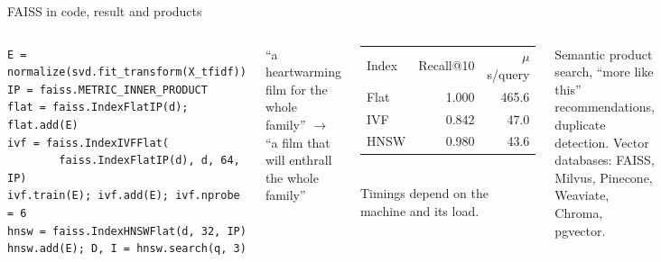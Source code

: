 \documentclass[aspectratio=169,11pt]{beamer}
\begin{document}
\begin{frame}[fragile]{FAISS in code, result and products}
\begin{columns}[T]
\begin{bcode}
\begin{lstlisting}
E = normalize(svd.fit_transform(X_tfidf))
IP = faiss.METRIC_INNER_PRODUCT
flat = faiss.IndexFlatIP(d); flat.add(E)
ivf = faiss.IndexIVFFlat(
        faiss.IndexFlatIP(d), d, 64, IP)
ivf.train(E); ivf.add(E); ivf.nprobe = 6
hnsw = faiss.IndexHNSWFlat(d, 32, IP)
hnsw.add(E); D, I = hnsw.search(q, 3)
\end{lstlisting}
\end{bcode}
\begin{bex}
``a heartwarming film for the whole family'' $\rightarrow$ ``a film that will enthrall the whole family''
\end{bex}
\begin{bres}
\begin{tabular}{lrr}
Index & Recall@10 & $\mu$s/query\\
Flat & 1.000 & 465.6\\
IVF & 0.842 & 47.0\\
HNSW & 0.980 & 43.6\\
\end{tabular}\\[1pt]
\footnotesize Timings depend on the machine and its load.
\end{bres}
\begin{bapp}
Semantic product search, ``more like this'' recommendations, duplicate detection. Vector databases: FAISS, Milvus, Pinecone, Weaviate, Chroma, pgvector.
\end{bapp}
\end{columns}
\end{frame}

\end{document}
